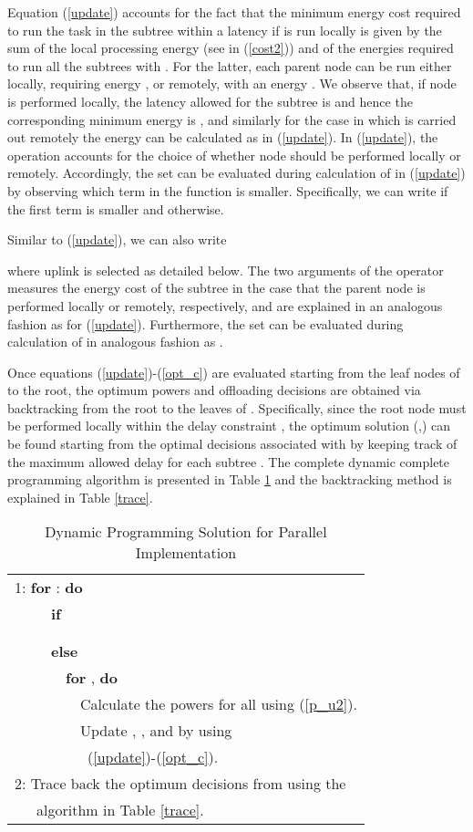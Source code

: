 \documentclass[journal,twocolumn,10pt,twoside]{IEEEtranTCOM}
\theoremstyle{plain}
\theoremstyle{plain}
\theoremstyle{remark}
\begin{document}
Equation (\ref{update}) accounts for the fact that the minimum energy cost required to run the task in the subtree  within a latency  if  is run locally is given by the sum of the local processing energy  (see  in (\ref{cost2})) and of the energies required to run all the subtrees  with . For the latter, each parent node  can be run either locally, requiring energy  , or remotely, with an energy . We observe that, if node  is performed locally, the latency allowed for the subtree  is  and hence the corresponding minimum energy is , and similarly for the case in which  is carried out remotely the energy can be calculated as in (\ref{update}). In (\ref{update}), the  operation accounts for the choice of whether node  should be performed locally or remotely. Accordingly, the set  can be evaluated during calculation of  in (\ref{update}) by observing which term in the function   is smaller. Specifically, we can write  if the first term is smaller and  otherwise.



Similar to (\ref{update}), we can also write

where uplink  is selected as detailed below. The two arguments of the  operator measures the energy cost of the subtree  in the case that the parent node  is performed locally or remotely, respectively, and are explained in an analogous fashion as for (\ref{update}). Furthermore, the set  can be evaluated during calculation of  in analogous fashion as .


Once equations (\ref{update})-(\ref{opt_c}) are evaluated starting from the leaf nodes  of  to the root, the optimum powers  and offloading decisions  are obtained via backtracking from the root to the leaves of . Specifically, since the root node must be performed locally  within the delay constraint , the optimum solution (,) can be found starting from the optimal decisions associated with  by keeping track  of  the maximum allowed delay  for each subtree . The complete dynamic complete programming algorithm is presented in Table \ref{al} and the backtracking method is explained in Table \ref{trace}.
\begin{table}
 \caption{Dynamic Programming Solution for Parallel Implementation}\label{al}
\begin{tabular}{l}
\hline
1:  \textbf{for} : \textbf{do}\\
~~~~~\textbf{if} \\
\\
\\
~~~~~\textbf{else}\\
~~~~~~~\textbf{for} ,  \textbf{do}\\
~~~~~~~~~Calculate the powers  for all  using (\ref{p_u2}).\\
~~~~~~~~~Update , ,  and  by using\\
~~~~~~~~~~(\ref{update})-(\ref{opt_c}).  \\
2: Trace back the optimum decisions from  using the\\
~~~algorithm in Table \ref{trace}.\\
\hline
\end{tabular}
\end{table}
\end{document}
